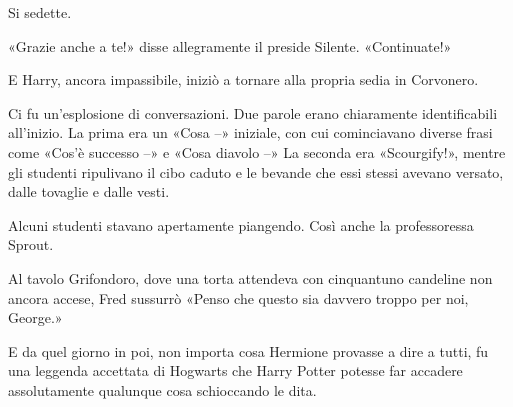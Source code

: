 Si sedette.

«Grazie anche a te!» disse allegramente il preside Silente. «Continuate!»

E Harry, ancora impassibile, iniziò a tornare alla propria sedia in Corvonero.

Ci fu un’esplosione di conversazioni. Due parole erano chiaramente identificabili all’inizio. La prima era un «Cosa –» iniziale, con cui cominciavano diverse frasi come «Cos’è successo –» e «Cosa diavolo –» La seconda era «Scourgify!», mentre gli studenti ripulivano il cibo caduto e le bevande che essi stessi avevano versato, dalle tovaglie e dalle vesti.

Alcuni studenti stavano apertamente piangendo. Così anche la professoressa Sprout.

Al tavolo Grifondoro, dove una torta attendeva con cinquantuno candeline non ancora accese, Fred sussurrò «Penso che questo sia davvero troppo per noi, George.»

E da quel giorno in poi, non importa cosa Hermione provasse a dire a tutti, fu una leggenda accettata di Hogwarts che Harry Potter potesse far accadere assolutamente qualunque cosa schioccando le dita.



